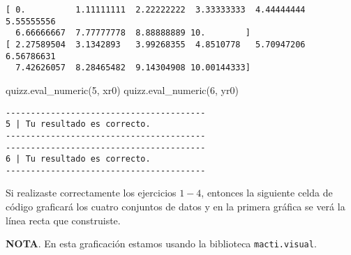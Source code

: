\documentclass[
  letterpaper,
  DIV=11,
  numbers=noendperiod]{scrreprt}
\newenvironment{Shaded}{\begin{snugshade}}{\end{snugshade}}
\newcommand{\NormalTok}[1]{\textcolor[rgb]{0.00,0.23,0.31}{#1}}
\newcommand{\StringTok}[1]{\textcolor[rgb]{0.13,0.47,0.30}{#1}}
\begin{document}
\begin{verbatim}
[ 0.          1.11111111  2.22222222  3.33333333  4.44444444  5.55555556
  6.66666667  7.77777778  8.88888889 10.        ]
[ 2.27589504  3.1342893   3.99268355  4.8510778   5.70947206  6.56786631
  7.42626057  8.28465482  9.14304908 10.00144333]
\end{verbatim}

\begin{Shaded}
\begin{Highlighting}[]
\NormalTok{quizz.eval\_numeric(}\StringTok{\textquotesingle{}5\textquotesingle{}}\NormalTok{, xr0)}
\NormalTok{quizz.eval\_numeric(}\StringTok{\textquotesingle{}6\textquotesingle{}}\NormalTok{, yr0)}
\end{Highlighting}
\end{Shaded}

\begin{verbatim}
----------------------------------------
5 | Tu resultado es correcto.
----------------------------------------
----------------------------------------
6 | Tu resultado es correcto.
----------------------------------------
\end{verbatim}

Si realizaste correctamente los ejercicios \(1-4\), entonces la
siguiente celda de código graficará los cuatro conjuntos de datos y en
la primera gráfica se verá la línea recta que construiste.

\textbf{NOTA}. En esta graficación estamos usando la biblioteca
\texttt{macti.visual}.
\end{document}

